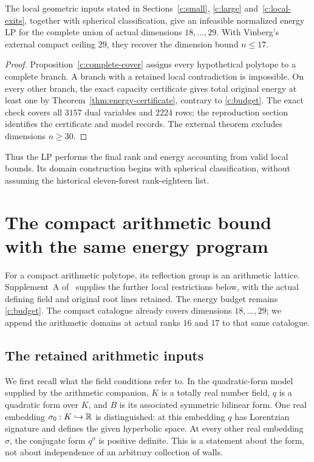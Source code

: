 \begin{theorem}\label{c:recovery}
The local geometric inputs stated in Sections~\ref{c:small},
\ref{c:large} and~\ref{c:local-exits}, together with spherical
classification, give an infeasible normalized energy LP for the complete
union of actual dimensions $18,\ldots,29$. With Vinberg's external
compact ceiling $29$, they recover the dimension bound $n\le17$.
\end{theorem}
\begin{proof}
Proposition~\ref{c:complete-cover} assigns every hypothetical polytope
to a complete branch. A branch with a retained local contradiction is
impossible. On every other branch, the exact capacity certificate gives
total original energy at least one by
Theorem~\ref{thm:energy-certificate}, contrary to \eqref{c:budget}.
The exact check covers all $3157$ dual variables and $2224$ rows;
the reproduction section identifies the certificate and model records.
The external theorem excludes dimensions $n\ge30$.
\end{proof}

Thus the LP performs the final rank and energy accounting from valid
local bounds. Its domain construction begins with spherical
classification, without assuming the historical eleven-forest
rank-eighteen list.

\section{The compact arithmetic bound with the same energy program}
\label{a:section}

For a compact arithmetic polytope, its reflection group is an arithmetic
lattice. Supplement~A of~\cite{BoundsSupplement} supplies the further
local restrictions below, with the actual defining field and original
root lines retained. The energy budget remains \eqref{c:budget}.
The compact catalogue already covers dimensions $18,\ldots,29$;
we append the arithmetic domains at actual ranks $16$ and $17$ to
that same catalogue.

\subsection{The retained arithmetic inputs}
\label{a:inputs}

We first recall what the field conditions refer to. In the quadratic-form
model supplied by the arithmetic companion, $K$ is a totally real number
field, $q$ is a quadratic form over $K$, and $B$ is its associated symmetric
bilinear form. One real embedding $\sigma_0:K\hookrightarrow\mathbb R$ is
distinguished: at this embedding $q$ has Lorentzian signature and defines
the given hyperbolic space. At every other real embedding $\sigma$, the
conjugate form $q^\sigma$ is positive definite. This is a statement about
the form, not about independence of an arbitrary collection of walls.

